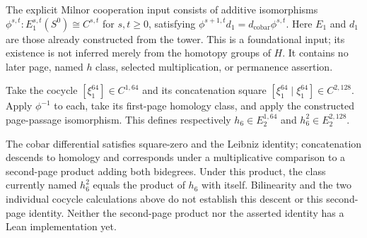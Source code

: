 \begin{definition}
  \label{def:h6-milnor-cooperations}
  \notready
  The explicit Milnor cooperation input consists of additive isomorphisms
  $\phi^{s,t}:E_1^{s,t}(S^0)\cong C^{s,t}$ for $s,t\ge0$, satisfying
  $\phi^{s+1,t}d_1=d_{\mathrm{cobar}}\phi^{s,t}$.
  Here $E_1$ and $d_1$ are those already constructed from the tower.
  This is a foundational input; its existence is not inferred merely from
  the homotopy groups of $H$.  It contains no later page, named $h$ class,
  selected multiplication, or permanence assertion.
\end{definition}

\begin{definition}
  \label{def:h6-constructed-square}
  \notready
  Take the cocycle $[\xi_1^{64}]\in C^{1,64}$ and its concatenation square
  $[\xi_1^{64}\mid\xi_1^{64}]\in C^{2,128}$.
  Apply $\phi^{-1}$ to each, take its first-page homology class, and apply
  the constructed page-passage isomorphism.  This defines respectively
  $h_6\in E_2^{1,64}$ and $h_6^2\in E_2^{2,128}$.
\end{definition}

\begin{proposition}
  \label{prop:h6-e2-square-identity}
  \notready
  The cobar differential satisfies square-zero and the Leibniz identity;
  concatenation descends to homology and corresponds under a multiplicative
  comparison to a second-page product adding both bidegrees. Under this product,
  the class currently named $h_6^2$ equals the product of $h_6$ with itself.
  Bilinearity and the two individual cocycle calculations above do not
  establish this descent or this second-page identity. Neither the
  second-page product nor the asserted identity has a Lean implementation yet.
\end{proposition}

